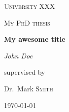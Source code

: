 \documentclass[a4paper, 11.5pt, twoside, openright, notitlepage]{book}
\begin{document}
\begin{titlepage}
	\centering
	{\textsc{University XXX} \par}
	\vspace{1cm}
	{\Large \textsc{My PhD thesis}\par}
	\vspace{1.5cm}
	{\huge\bfseries My awesome title\par}
	\vspace{2cm}
	{\Large\itshape John Doe\par}
	\vfill
	supervised by\par
	Dr.~Mark \textsc{Smith}
	\vfill
	{\large \today\par}
\end{titlepage}

\setcounter{page}{2}


\setcounter{tocdepth}{2}
\setcounter{secnumdepth}{3}

\tableofcontents

\listoffigures

\listoftables










\begin{appendix}
  
\end{appendix}



\cleardoublepage

\pagestyle{empty}



\end{document}

